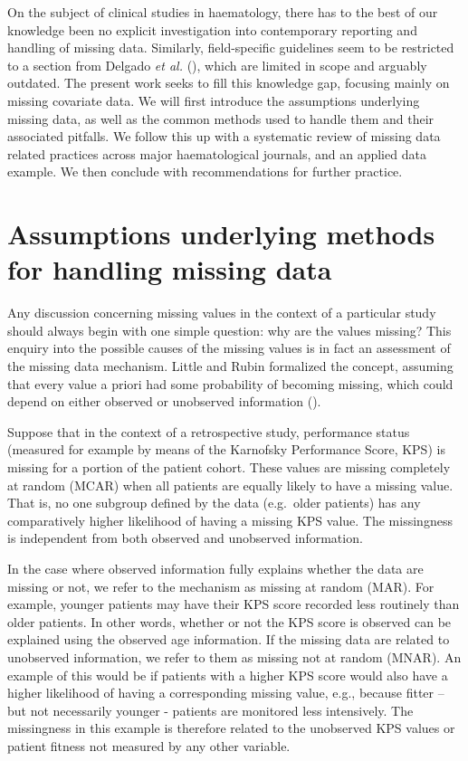 \documentclass[
  letterpaper,
  paper=240mm:170mm,
  twoside=true,
  open=right,
  fontsize=10pt,
  pagesize=false,
  BCOR=15mm,
  DIV=14,
  headinclude=true,
  footinclude=false,
  headsepline=on]{scrbook}
\begin{document}
On the subject of clinical studies in haematology, there has to the best
of our knowledge been no explicit investigation into contemporary
reporting and handling of missing data. Similarly, field-specific
guidelines seem to be restricted to a section from Delgado \emph{et al.}
(), which are
limited in scope and arguably outdated. The present work seeks to fill
this knowledge gap, focusing mainly on missing covariate data. We will
first introduce the assumptions underlying missing data, as well as the
common methods used to handle them and their associated pitfalls. We
follow this up with a systematic review of missing data related
practices across major haematological journals, and an applied data
example. We then conclude with recommendations for further practice.

\section{Assumptions underlying methods for handling missing
data}\label{assumptions-underlying-methods-for-handling-missing-data}

Any discussion concerning missing values in the context of a particular
study should always begin with one simple question: why are the values
missing? This enquiry into the possible causes of the missing values is
in fact an assessment of the missing data mechanism. Little and Rubin
formalized the concept, assuming that every value a priori had some
probability of becoming missing, which could depend on either observed
or unobserved information
().

Suppose that in the context of a retrospective study, performance status
(measured for example by means of the Karnofsky Performance Score, KPS)
is missing for a portion of the patient cohort. These values are missing
completely at random (MCAR) when all patients are equally likely to have
a missing value. That is, no one subgroup defined by the data
(e.g.~older patients) has any comparatively higher likelihood of having
a missing KPS value. The missingness is independent from both observed
and unobserved information.

In the case where observed information fully explains whether the data
are missing or not, we refer to the mechanism as missing at random
(MAR). For example, younger patients may have their KPS score recorded
less routinely than older patients. In other words, whether or not the
KPS score is observed can be explained using the observed age
information. If the missing data are related to unobserved information,
we refer to them as missing not at random (MNAR). An example of this
would be if patients with a higher KPS score would also have a higher
likelihood of having a corresponding missing value, e.g., because fitter
-- but not necessarily younger - patients are monitored less
intensively. The missingness in this example is therefore related to the
unobserved KPS values or patient fitness not measured by any other
variable.
\end{document}
